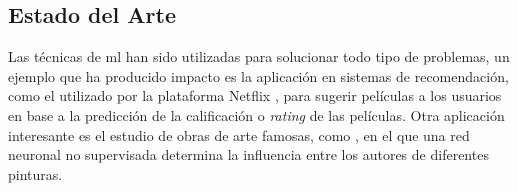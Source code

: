 


\subsection{Estado del Arte}

Las técnicas de \acrshort{ml} han sido utilizadas para solucionar todo tipo de problemas, un ejemplo que ha producido impacto es la aplicación en sistemas de recomendación, como el utilizado por la plataforma Netflix \cite{Koren2009}, para sugerir películas a los usuarios en base a la predicción de la calificación o \emph{rating} de las películas. Otra aplicación interesante es el estudio de obras de arte famosas, como \cite{Saleh2014}, en el que una red neuronal no supervisada determina la influencia entre los autores de diferentes pinturas.
%

